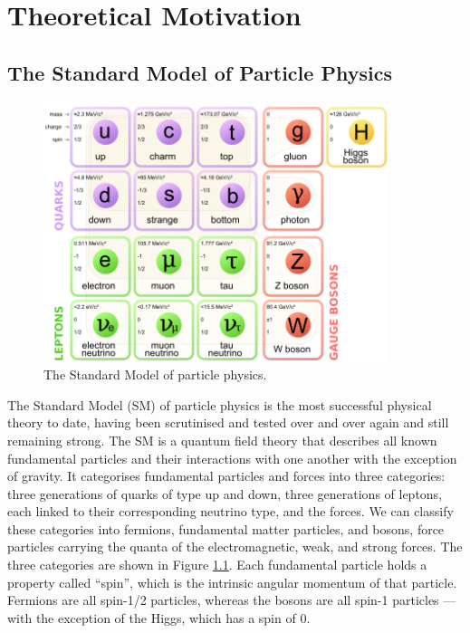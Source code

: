 \chapter{Theoretical Motivation} \label{chap-theory}


\section{The Standard Model of Particle Physics} \label{sec-StandardModel}

\begin{figure}
\begin{center}
\includegraphics[width=0.9\textwidth]{Figures/StandardModel.png}
\end{center}
\caption{The Standard Model of particle physics.}
\label{fig-SM}
\end{figure}

The Standard Model (SM) of particle physics is the most successful physical theory to date, having been scrutinised and tested over and over 
again and still remaining strong. The SM is a quantum field theory that describes all known fundamental particles and their interactions with 
one another with the exception of gravity. It categorises fundamental particles and forces into three categories: three generations of quarks 
of type up and down, three generations of leptons, each linked to their corresponding neutrino type, and the forces. We can classify these 
categories into fermions, fundamental matter particles, and bosons, force particles carrying the quanta of the electromagnetic, weak, and 
strong forces. The three categories are shown in Figure \ref{fig-SM}. Each fundamental particle holds a property called ``spin'', which is the intrinsic angular momentum of that particle. Fermions are all spin-1/2 particles, whereas the bosons are all spin-1 particles --- with the exception of the Higgs, which has a spin of 0.

